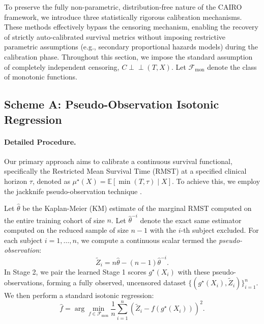 \documentclass[11pt]{article}
\theoremstyle{plain}
\theoremstyle{plain}
\theoremstyle{plain}
\theoremstyle{plain}
\theoremstyle{plain}
\theoremstyle{plain}
\theoremstyle{plain}
\begin{document}
{To preserve the fully non-parametric, distribution-free nature of the CAIRO framework, we introduce three statistically rigorous calibration mechanisms. These methods effectively bypass the censoring mechanism, enabling the recovery of strictly auto-calibrated survival metrics without imposing restrictive parametric assumptions (e.g., secondary proportional hazards models) during the calibration phase. Throughout this section, we impose the standard assumption of completely independent censoring, $C \perp\!\!\!\perp (T, X)$. Let $\mathcal{F}_{\text{mon}}$ denote the class of monotonic functions.

\subsection{Scheme A: Pseudo-Observation Isotonic Regression}

\paragraph{Detailed Procedure.}
Our primary approach aims to calibrate a continuous survival functional, specifically the Restricted Mean Survival Time (RMST) at a specified clinical horizon $\tau$, denoted as $\mu^\star(X) = \mathbb{E}[\min(T, \tau) \mid X]$. To achieve this, we employ the jackknife pseudo-observation technique \citep{andersen2010pseudo}. 

Let $\hat{\theta}$ be the Kaplan-Meier (KM) estimate of the marginal RMST computed on the entire training cohort of size $n$. Let $\hat{\theta}^{-i}$ denote the exact same estimator computed on the reduced sample of size $n-1$ with the $i$-th subject excluded. For each subject $i=1, \dots, n$, we compute a continuous scalar termed the \emph{pseudo-observation}:
\begin{equation}
    \tilde{Z}_i = n\hat{\theta} - (n-1)\hat{\theta}^{-i}.
\end{equation}
In Stage 2, we pair the learned Stage 1 scores $g^\star(X_i)$ with these pseudo-observations, forming a fully observed, uncensored dataset $\{(g^\star(X_i), \tilde{Z}_i)\}_{i=1}^n$. We then perform a standard isotonic regression:
\begin{equation}
    \hat{f} = \arg\min_{f \in \mathcal{F}_{\text{mon}}} \frac{1}{n} \sum_{i=1}^n \left( \tilde{Z}_i - f(g^\star(X_i)) \right)^2.
\end{equation}

}
\end{document}
